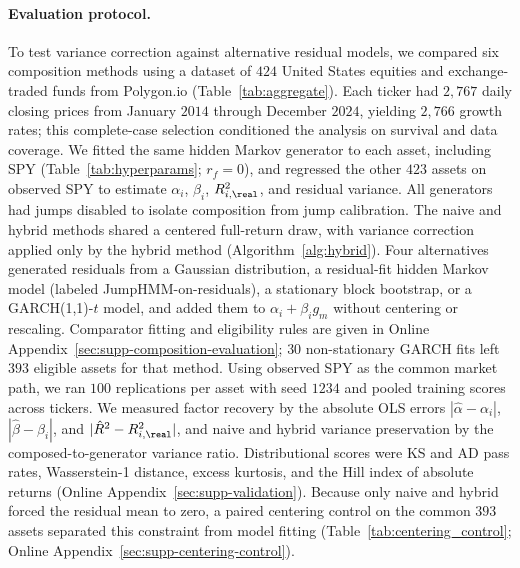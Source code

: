 \paragraph{Evaluation protocol.}

To test variance correction against alternative residual models, we
compared six composition methods using a dataset of $424$ United
States equities and exchange-traded funds from Polygon.io (Table~\ref{tab:aggregate}).
Each ticker had $2{,}767$ daily closing prices from January $2014$
through December $2024$, yielding $2{,}766$ growth rates; this
complete-case selection conditioned the analysis on survival and data
coverage. We fitted the same hidden Markov generator to each asset,
including SPY (Table~\ref{tab:hyperparams}; $r_f=0$), and regressed
the other $423$ assets on observed SPY to estimate $\alpha_i$,
$\beta_i$, $R^2_{i,\real}$, and residual variance. All generators
had jumps disabled to isolate composition from jump calibration. The
naive and hybrid methods shared a centered full-return draw, with
variance correction applied only by the hybrid method
(Algorithm~\ref{alg:hybrid}). Four alternatives generated residuals
from a Gaussian distribution, a residual-fit hidden Markov model
(labeled JumpHMM-on-residuals), a stationary block bootstrap, or a
GARCH(1,1)-$t$ model, and added them to $\alpha_i+\beta_i g_m$
without centering or rescaling. Comparator fitting and eligibility
rules are given in Online Appendix~\ref{sec:supp-composition-evaluation};
$30$ non-stationary GARCH fits left $393$ eligible assets for that
method. Using observed SPY as the common market path, we ran $100$
replications per asset with seed $1234$ and pooled training scores
across tickers. We measured factor recovery by the absolute OLS
errors $|\hat\alpha-\alpha_i|$, $|\hat\beta-\beta_i|$, and
$|\hat R^2-R^2_{i,\real}|$, and naive and hybrid variance preservation
by the composed-to-generator variance ratio. Distributional scores
were KS and AD pass rates, Wasserstein-1 distance, excess kurtosis,
and the Hill index of absolute returns (Online
Appendix~\ref{sec:supp-validation}). Because only naive and hybrid
forced the residual mean to zero, a paired centering control on the
common $393$ assets separated this constraint from model fitting
(Table~\ref{tab:centering_control}; Online
Appendix~\ref{sec:supp-centering-control}).

